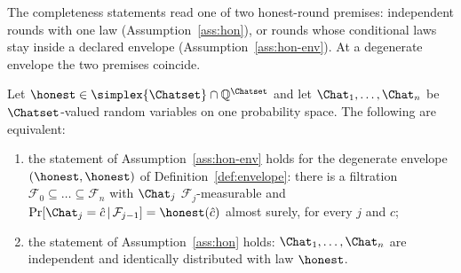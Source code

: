 
The completeness statements read one of two honest-round premises: independent
rounds with one law (Assumption~\ref{ass:hon}), or rounds whose conditional
laws stay inside a declared envelope (Assumption~\ref{ass:hon-env}). At a
degenerate envelope the two premises coincide.

\begin{lemma}\label{lem:hon-degenerate}
Let $\honest\in\simplex{\Chatset}\cap\mathbb{Q}^{\Chatset}$ and let
$\Chat_1,\dots,\Chat_n$ be $\Chatset$-valued random variables on one
probability space. The following are equivalent:
\begin{enumerate}[label=(\alph*),leftmargin=2.2em]
\item the statement of Assumption~\ref{ass:hon-env} holds for the degenerate
envelope $(\honest,\honest)$ of Definition~\ref{def:envelope}: there is a
filtration $\mathcal{F}_0\subseteq\dots\subseteq\mathcal{F}_n$ with $\Chat_j$
$\mathcal{F}_j$-measurable and
$\Pr[\Chat_j=\hat c\,|\,\mathcal{F}_{j-1}]=\honest(\hat c)$ almost surely,
for every $j$ and $\hat c$;
\item the statement of Assumption~\ref{ass:hon} holds: $\Chat_1,\dots,\Chat_n$
are independent and identically distributed with law $\honest$.
\end{enumerate}
\end{lemma}

